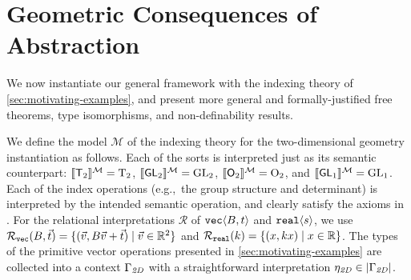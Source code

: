 \section{Geometric Consequences of Abstraction}
\label{sec:instantiations}
We now instantiate our general framework %
with
the indexing theory of \autoref{sec:motivating-examples}, and present
more general and formally-justified free theorems, type
isomorphisms, and non-definability results.


We define the model $\mathcal{M}$ of the indexing theory for the two-dimensional
geometry instantiation as follows. Each of the sorts is interpreted just as
its semantic counterpart: $\llbracket \mathsf{T}_2 \rrbracket^{\mathcal{M}} = \mathrm{T}_2$, $
\llbracket \mathsf{GL}_2 \rrbracket^{\mathcal{M}} = \mathrm{GL}_2$, $ \llbracket \mathsf{O}_2 \rrbracket^{\mathcal{M}} = \mathrm{O}_2$,
and $ \llbracket \mathsf{GL}_1 \rrbracket^{\mathcal{M}} = \mathrm{GL}_1$.
Each of the index operations (e.g.,~the group structure and
determinant) is interpreted by the intended semantic operation, and
clearly satisfy the axioms in . For the
relational interpretations $\mathcal{R}$ of $\textup{\texttt{vec}}\langle B,t \rangle$ and
$\textup{\texttt{real}}\langle s \rangle$, we use $\mathcal{R}_{\textup{\texttt{vec}}}(B,\vec{t}) = \{
(\vec{v}, B\vec{v} + \vec{t}) \mathrel| \vec{v} \in \mathbb{R}^2 \}$ and
$\mathcal{R}_{\textup{\texttt{real}}}(k) = \{ (x, kx) \mathrel| x \in \mathbb{R} \}$. The
types of the primitive vector operations presented in
\autoref{sec:motivating-examples} are collected into a context
$\Gamma_{\mathit{2D}}$ with a straightforward interpretation $\eta_{\mathit{2D}} \in
\left| \Gamma_{\mathit{2D}}\right|$.


